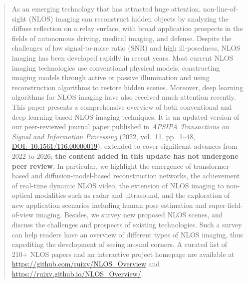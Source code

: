\begin{abstract}
    As an emerging technology that has attracted huge attention, non-line-of-sight (NLOS) imaging can reconstruct hidden objects by analyzing the diffuse reflection on a relay surface, with broad application prospects in the fields of autonomous driving, medical imaging, and defense. Despite the challenges of low signal-to-noise ratio (SNR) and high ill-posedness, NLOS imaging has been developed rapidly in recent years. Most current NLOS imaging technologies use conventional physical models, constructing imaging models through active or passive illumination and using reconstruction algorithms to restore hidden scenes. Moreover, deep learning algorithms for NLOS imaging have also received much attention recently. This paper presents a comprehensive overview of both conventional and deep learning-based NLOS imaging techniques. It is an updated version of our peer-reviewed journal paper published in \emph{APSIPA Transactions on Signal and Information Processing} (2022, vol.~11, pp.~1--48, \href{https://doi.org/10.1561/116.00000019}{DOI:~10.1561/116.00000019}), extended to cover significant advances from 2022 to 2026; \textbf{the content added in this update has not undergone peer review}. In particular, we highlight the emergence of transformer-based and diffusion-model-based reconstruction networks, the achievement of real-time dynamic NLOS video, the extension of NLOS imaging to non-optical modalities such as radar and ultrasound, and the exploration of new application scenarios including human pose estimation and super-field-of-view imaging. Besides, we survey new proposed NLOS scenes, and discuss the challenges and prospects of existing technologies. Such a survey can help readers have an overview of different types of NLOS imaging, thus expediting the development of seeing around corners. A curated list of 210+ NLOS papers and an interactive project homepage are available at \url{https://github.com/ruixv/NLOS_Overview} and \url{https://ruixv.github.io/NLOS_Overview/}.
\end{abstract}
